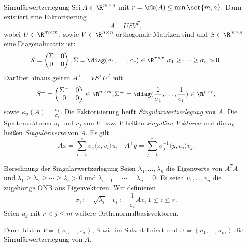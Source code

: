 \begin{karte}{Singulärwertzerlegung}
    Sei \( A \in \R^{m\times n} \) mit \(r = \rk(A) \leq \min\set{m,n}\). Dann existiert 
    eine Faktorisierung 
    \[ A = USV^T, \]
    wobei \( U \in \R^{m\times m} \), sowie \( V \in \R^{n\times n} \) orthogonale Matrizen 
    sind und \( S \in \R^{m\times n} \) eine Diagonalmatrix ist: 
    \[ S = \begin{pmatrix}
        \Sigma & 0 \\ 0 & 0
    \end{pmatrix}, \Sigma = \diag(\sigma_1, \ldots, \sigma_r) \in \R^{r\times r}, 
    \sigma_1 \geq \cdots \geq \sigma_r > 0. \]
    Darüber hinaus gelten \( A^+ = V S^+ U^T \) mit 
    \[ S^+ = \begin{pmatrix}
        \Sigma^+ & 0 \\ 0 & 0
    \end{pmatrix} \in \R^{n\times m}, \Sigma^+ = \diag(\frac{1}{\sigma_1}, \ldots, \frac{1}{\sigma_r}) \in \R^{r\times r}, \]
    sowie \( \kappa_2(A) = \frac{\sigma_1}{\sigma_r} \). Die Faktorisierung heißt 
    \textit{Singulärwertzerlegung} von \(A\). Die Spaltenvektoren \( u_i \) und \(v_j\)
    von \(U\) bzw. \(V\) heißen \textit{singuläre Vektoren} und die \( \sigma_k \) heißen 
    \textit{Singulärwerte} von \(A\). Es gilt 
    \[ Ax = \sum_{i=1}^r \sigma_i \langle x, v_i\rangle u_i \quad 
    A^+y = \sum_{j=1}^r \sigma_j^{-1}\langle y, u_j \rangle v_j. \]
\end{karte}

\begin{karte}{Berechnung der Singulärwertzerlegung}
    Seien \( \lambda_1, \ldots, \lambda_n \) die Eigenwerte von \( A^T A \)
    und \( \lambda_1 \geq \lambda_2 \geq \cdots \geq \lambda_r > 0 \) und 
    \( \lambda_{r+1} = \cdots = \lambda_n = 0 \). Es seien \( v_1,\ldots, v_n \) 
    die zugehörige ONB aus Eigenvektoren. Wir definieren 
    \[ \sigma_i := \sqrt{\lambda_i} \quad u_i := \frac{1}{\sigma_i} A v_i \;1\leq i \leq r. \]
    Seien \( u_j \) mit \( r < j \leq m \) weitere Orthonormalbasisvektoren.

    Dann bilden \( V = (v_1, \ldots, v_n) \), \(S\) wie im Satz definiert 
    und \( U = (u_1, \ldots, u_m) \) die Singulärwertzerlegung von \(A\).
\end{karte}